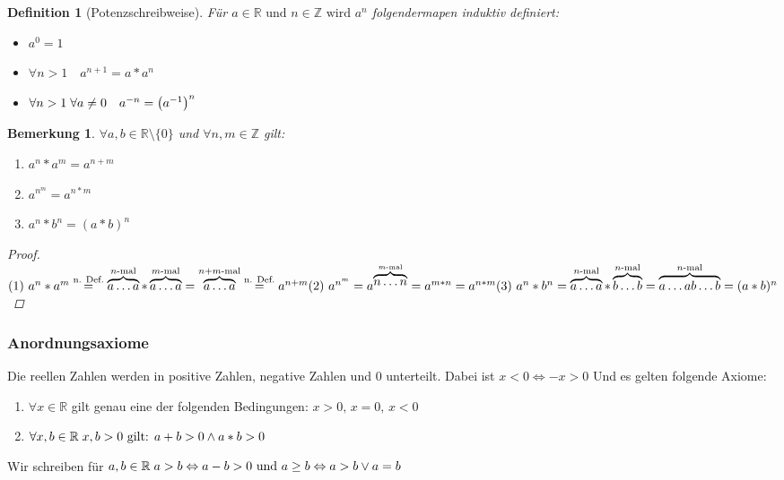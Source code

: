 \documentclass[a4paper,titlepage,oneside]{article}
\def\Z{\ensuremath{\mathbb{Z}} }
\def\R{\ensuremath{\mathbb{R}} }
\newcommand{\fa}{\ensuremath{\forall}}
\def\sp{\hspace{0,1cm}}
\theoremstyle{thmstyle}
\newtheorem{defi}[satz]{Definition}
\newtheorem{bem}[satz]{Bemerkung}
\begin{document}
\begin{defi}[Potenzschreibweise]
Für \(a \in \R \text{ und }n \in \Z \text{ wird }a^n\) folgendermapen induktiv definiert:
\begin{itemize}
\item \(a^0 = 1\)
\item \(\fa n > 1 \quad a^{n+1} = a * a^n \)
\item \(\fa n > 1 \sp \fa a \ne 0 \quad a^{-n} = \left(a^{-1}\right)^n\)
\end{itemize}
\end{defi}
\newpage

\begin{bem}
\(\fa a, b \in \R \setminus \{0\} \) und \( \fa n, m \in \Z\) gilt:
\begin{enumerate}[label=(\arabic*)]
\item \(a^n * a^m = a^{n+m} \)
\item \(a^{n^m} = a^{n * m} \)
\item \(a^n * b^n = (a * b)^n \)
\end{enumerate}
\begin{proof}
\begin{math}\\
\text{(1) } a^n * a^m \overset{\text{n. Def.}}{=} \overbrace{a \dots a}^{n\text{-mal}}*\overbrace{a \dots a}^{m\text{-mal}} = \overbrace{a \dots a}^{n+m\text{-mal}} \overset{\text{n. Def.}}{=} a^{n+m}\\
\text{(2) }  a^{n^m} = a^{\overbrace{n \dots n}^{m\text{-mal}}} = a^{m * n} = a^{n*m}\\
\text{(3) }  a^n * b^n = \overbrace{a \dots a}^{n\text{-mal}}*\overbrace{b \dots b}^{n\text{-mal}} = \overbrace{a \dots a b \dots b}^{n\text{-mal}} = (a*b)^{n}\\
\end{math}
\end{proof}
\end{bem}

\subsubsection{Anordnungsaxiome}
Die reellen Zahlen werden in positive Zahlen, negative Zahlen und 0 unterteilt. Dabei ist \(x < 0 \Leftrightarrow -x > 0\) Und es gelten folgende Axiome:
\begin{enumerate}[label=(\arabic*)]
\item \(\fa x \in \R \) gilt genau eine der folgenden Bedingungen: \(x > 0\text{, } x = 0\text{, } x < 0 \)
\item \(\fa x,b \in \R \sp x,b > 0 \text{ gilt: } a + b > 0 \land a * b > 0\)
\end{enumerate}
Wir schreiben für \(a, b \in \R \sp a > b \Leftrightarrow a - b > 0\text{ und }a \ge b \Leftrightarrow a > b \lor a = b \)
\end{document}
